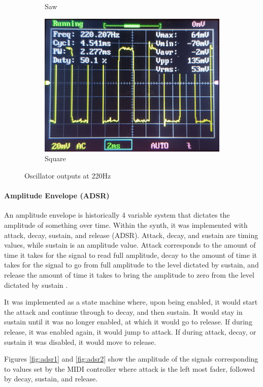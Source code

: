 \documentclass[12pt]{article}
\begin{document}
\begin{figure}[htb]
\begin{subfigure}{.49\textwidth}
        \caption{Saw}
        \label{fig:saw}
    \end{subfigure}
    \begin{subfigure}{.49\textwidth}
        \centering
        \includegraphics[width=0.75\linewidth]{img/square.png}
        \caption{Square}
        \label{fig:square}
    \end{subfigure}
    \caption{Oscillator outputs at 220Hz}
    \label{fig:oscillator}
\end{figure}

\paragraph{Amplitude Envelope (ADSR)}

An amplitude envelope is historically 4 variable system that dictates the amplitude of something over time. Within the synth, it was implemented with attack, decay, sustain, and release (ADSR). Attack, decay, and sustain are timing values, while sustain is an amplitude value. Attack corresponds to the amount of time it takes for the signal to read full amplitude, decay to the amount of time it takes for the signal to go from full amplitude to the level dictated by sustain, and release the amount of time it takes to bring the amplitude to zero from the level dictated by sustain \cite{wiki_adsr}.

It was implemented as a state machine where, upon being enabled, it would start the attack and continue through to decay, and then sustain. It would stay in sustain until it was no longer enabled, at which it would go to release. If during release, it was enabled again, it would jump to attack. If during attack, decay, or sustain it was disabled, it would move to release.

Figures \ref{fig:adsr1} and \ref{fig:adsr2} show the amplitude of the signals corresponding to values set by the MIDI controller where attack is the left most fader, followed by decay, sustain, and release.
\end{document}
